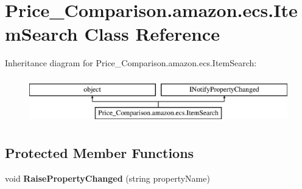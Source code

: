 \hypertarget{class_price___comparison_1_1amazon_1_1ecs_1_1_item_search}{\section{Price\-\_\-\-Comparison.\-amazon.\-ecs.\-Item\-Search Class Reference}
\label{class_price___comparison_1_1amazon_1_1ecs_1_1_item_search}
}


 


Inheritance diagram for Price\-\_\-\-Comparison.\-amazon.\-ecs.\-Item\-Search\-:\begin{figure}[H]
\begin{center}
\leavevmode
\includegraphics[height=2.000000cm]{class_price___comparison_1_1amazon_1_1ecs_1_1_item_search}
\end{center}
\end{figure}
\subsection*{Protected Member Functions}
\begin{DoxyCompactItemize}
\item 
\hypertarget{class_price___comparison_1_1amazon_1_1ecs_1_1_item_search_a27c8de4e1b83fac0d4202ae6c2da7a96}{void {\bfseries Raise\-Property\-Changed} (string property\-Name)}\label{class_price___comparison_1_1amazon_1_1ecs_1_1_item_search_a27c8de4e1b83fac0d4202ae6c2da7a96}

\end{DoxyCompactItemize}
